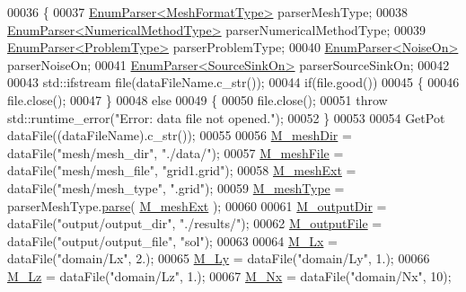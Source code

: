\begin{DoxyCode}
00036 \{
00037     \hyperlink{classFVCode3D_1_1EnumParser}{EnumParser<MeshFormatType>} parserMeshType;
00038     \hyperlink{classFVCode3D_1_1EnumParser}{EnumParser<NumericalMethodType>} parserNumericalMethodType;
00039     \hyperlink{classFVCode3D_1_1EnumParser}{EnumParser<ProblemType>} parserProblemType;
00040     \hyperlink{classFVCode3D_1_1EnumParser}{EnumParser<NoiseOn>} parserNoiseOn;
00041     \hyperlink{classFVCode3D_1_1EnumParser}{EnumParser<SourceSinkOn>} parserSourceSinkOn;
00042 
00043     std::ifstream file(dataFileName.c\_str());
00044     \textcolor{keywordflow}{if}(file.good())
00045     \{
00046         file.close();
00047     \}
00048     \textcolor{keywordflow}{else}
00049     \{
00050         file.close();
00051         \textcolor{keywordflow}{throw} std::runtime\_error(\textcolor{stringliteral}{"Error: data file not opened."});
00052     \}
00053 
00054     GetPot dataFile((dataFileName).c\_str());
00055 
00056     \hyperlink{classFVCode3D_1_1Data_ac3c807842fa923bda89a90635b51daea}{M\_meshDir} = dataFile(\textcolor{stringliteral}{"mesh/mesh\_dir"}, \textcolor{stringliteral}{"./data/"});
00057     \hyperlink{classFVCode3D_1_1Data_ab939b8425e4b01d2c000adfb0ea2d35a}{M\_meshFile} = dataFile(\textcolor{stringliteral}{"mesh/mesh\_file"}, \textcolor{stringliteral}{"grid1.grid"});
00058     \hyperlink{classFVCode3D_1_1Data_a6808fd51d3a0b46b77ddd500c836abb9}{M\_meshExt} = dataFile(\textcolor{stringliteral}{"mesh/mesh\_type"}, \textcolor{stringliteral}{".grid"});
00059     \hyperlink{classFVCode3D_1_1Data_a3829da70dbf5688d6188ec0108bae59d}{M\_meshType} = parserMeshType.\hyperlink{classFVCode3D_1_1EnumParser_a47ae536aad82ef52509472c0c7f1022e}{parse}( \hyperlink{classFVCode3D_1_1Data_a6808fd51d3a0b46b77ddd500c836abb9}{M\_meshExt} );
00060 
00061     \hyperlink{classFVCode3D_1_1Data_af5685db93f1e6c697fa63241351d1bcd}{M\_outputDir} = dataFile(\textcolor{stringliteral}{"output/output\_dir"}, \textcolor{stringliteral}{"./results/"});
00062     \hyperlink{classFVCode3D_1_1Data_a34713b7f3fd7176b0745f902713722dd}{M\_outputFile} = dataFile(\textcolor{stringliteral}{"output/output\_file"}, \textcolor{stringliteral}{"sol"});
00063 
00064     \hyperlink{classFVCode3D_1_1Data_ae5452237bcd372f1f58b338eb81c03c9}{M\_Lx} = dataFile(\textcolor{stringliteral}{"domain/Lx"}, 2.);
00065     \hyperlink{classFVCode3D_1_1Data_ab1c235ca1a351fc10315c8b28f84549c}{M\_Ly} = dataFile(\textcolor{stringliteral}{"domain/Ly"}, 1.);
00066     \hyperlink{classFVCode3D_1_1Data_aec68be07c237ed1170bdbb876b01ec95}{M\_Lz} = dataFile(\textcolor{stringliteral}{"domain/Lz"}, 1.);
00067     \hyperlink{classFVCode3D_1_1Data_ae8b5472d8bc05b2b312380fe0bcfc8f9}{M\_Nx} = dataFile(\textcolor{stringliteral}{"domain/Nx"}, 10);

\end{DoxyCode}
